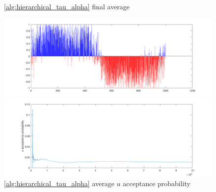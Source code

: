 \documentclass{siamart1116}
\begin{document}
\begin{figure}[!htb]
    \begin{minipage}{0.48\textwidth}
        \centering
        \caption{\label{fig:moon_centered_avg} \cref{alg:hierarchical_tau_alpha} final average}
        \includegraphics[width=\linewidth]{graphics/moons/centered/final_avg.png}
    \end{minipage} \hfill
    \begin{minipage}{0.48\textwidth}
        \centering
        \caption{\label{fig:moon_centered_accept} \cref{alg:hierarchical_tau_alpha} average $u$ acceptance probability}
        \includegraphics[width=\linewidth]{graphics/moons/centered/acceptance_u_probability.png}
    \end{minipage}
\end{figure}
\end{document}
